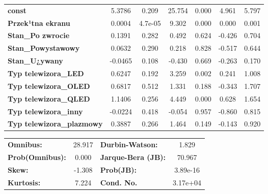 \documentclass[11pt,a4paper]{article}
\begin{document}
\begin{center}
\begin{tabular}{lcccccc}
					\textbf{const}                    &       5.3786  &        0.209     &    25.754  &         0.000        &        4.961    &        5.797     \\
					\textbf{Przek¹tna ekranu}         &       0.0004  &      4.7e-05     &     9.302  &         0.000        &        0.000    &        0.001     \\
					\textbf{Stan\_Po zwrocie}         &       0.1391  &        0.282     &     0.492  &         0.624        &       -0.426    &        0.704     \\
					\textbf{Stan\_Powystawowy}        &       0.0632  &        0.290     &     0.218  &         0.828        &       -0.517    &        0.644     \\
					\textbf{Stan\_U¿ywany}            &      -0.0465  &        0.108     &    -0.430  &         0.669        &       -0.263    &        0.170     \\
					\textbf{Typ telewizora\_LED}      &       0.6247  &        0.192     &     3.259  &         0.002        &        0.241    &        1.008     \\
					\textbf{Typ telewizora\_OLED}     &       0.6817  &        0.512     &     1.331  &         0.188        &       -0.343    &        1.707     \\
					\textbf{Typ telewizora\_QLED}     &       1.1406  &        0.256     &     4.449  &         0.000        &        0.628    &        1.654     \\
					\textbf{Typ telewizora\_inny}     &      -0.0224  &        0.418     &    -0.054  &         0.957        &       -0.860    &        0.815     \\
					\textbf{Typ telewizora\_plazmowy} &       0.3887  &        0.266     &     1.464  &         0.149        &       -0.143    &        0.920     \\
					 
				\end{tabular}
				\begin{tabular}{lclc}
					\textbf{Omnibus:}       & 28.917 & \textbf{  Durbin-Watson:     } &    1.829  \\
					\textbf{Prob(Omnibus):} &  0.000 & \textbf{  Jarque-Bera (JB):  } &   70.967  \\
					\textbf{Skew:}          & -1.308 & \textbf{  Prob(JB):          } & 3.89e-16  \\
					\textbf{Kurtosis:}      &  7.224 & \textbf{  Cond. No.          } & 3.17e+04  \\
					 
				\end{tabular}
			\end{center}
		
\end{document}
